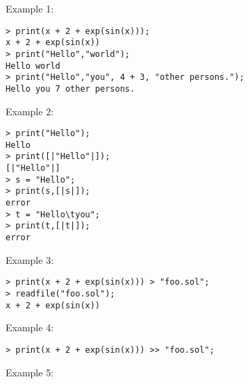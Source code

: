 \noindent Example 1: 
\begin{center}\begin{minipage}{15cm}\begin{Verbatim}[frame=single]
> print(x + 2 + exp(sin(x))); 
x + 2 + exp(sin(x))
> print("Hello","world");
Hello world
> print("Hello","you", 4 + 3, "other persons.");
Hello you 7 other persons.
\end{Verbatim}
\end{minipage}\end{center}
\noindent Example 2: 
\begin{center}\begin{minipage}{15cm}\begin{Verbatim}[frame=single]
> print("Hello");
Hello
> print([|"Hello"|]);
[|"Hello"|]
> s = "Hello";
> print(s,[|s|]);
error
> t = "Hello\tyou";
> print(t,[|t|]);
error
\end{Verbatim}
\end{minipage}\end{center}
\noindent Example 3: 
\begin{center}\begin{minipage}{15cm}\begin{Verbatim}[frame=single]
> print(x + 2 + exp(sin(x))) > "foo.sol";
> readfile("foo.sol");
x + 2 + exp(sin(x))

\end{Verbatim}
\end{minipage}\end{center}
\noindent Example 4: 
\begin{center}\begin{minipage}{15cm}\begin{Verbatim}[frame=single]
> print(x + 2 + exp(sin(x))) >> "foo.sol";
\end{Verbatim}
\end{minipage}\end{center}
\noindent Example 5: 
